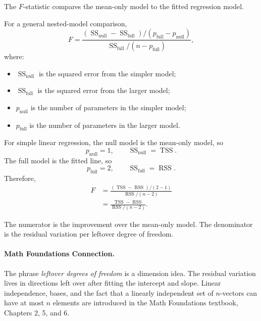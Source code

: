 The $F$-statistic compares the mean-only model to the fitted regression model.

For a general nested-model comparison,
\begin{equation}
  F=\frac{\left(\operatorname{SS}_{\text{null}}-\operatorname{SS}_{\text{full}}\right)/(p_{\text{full}}-p_{\text{null}})}
  {\operatorname{SS}_{\text{full}}/(n-p_{\text{full}})},
  \label{eq:ch6-general-f}
\end{equation}
where:
\begin{itemize}
  \item $\operatorname{SS}_{\text{null}}$ is the squared error from the simpler model;
  \item $\operatorname{SS}_{\text{full}}$ is the squared error from the larger model;
  \item $p_{\text{null}}$ is the number of parameters in the simpler model;
  \item $p_{\text{full}}$ is the number of parameters in the larger model.
\end{itemize}

For simple linear regression, the null model is the mean-only model, so
\begin{equation}
  p_{\text{null}}=1,
  \qquad
  \operatorname{SS}_{\text{null}}=\operatorname{TSS}.
\end{equation}
The full model is the fitted line, so
\begin{equation}
  p_{\text{full}}=2,
  \qquad
  \operatorname{SS}_{\text{full}}=\operatorname{RSS}.
\end{equation}
Therefore,
\begin{align}
  F
  &=\frac{(\operatorname{TSS}-\operatorname{RSS})/(2-1)}{\operatorname{RSS}/(n-2)} \\
  &=\boxed{\frac{\operatorname{TSS}-\operatorname{RSS}}{\operatorname{RSS}/(n-2)}}.
  \label{eq:ch6-slr-f}
\end{align}

The numerator is the improvement over the mean-only model.  The denominator is the residual variation per leftover degree of freedom.

\paragraph{Math Foundations Connection.}
The phrase \emph{leftover degrees of freedom} is a dimension idea.  The residual variation lives in directions left over after fitting the intercept and slope.  Linear independence, bases, and the fact that a linearly independent set of $n$-vectors can have at most $n$ elements are introduced in the Math Foundations textbook, Chapters 2, 5, and 6.

